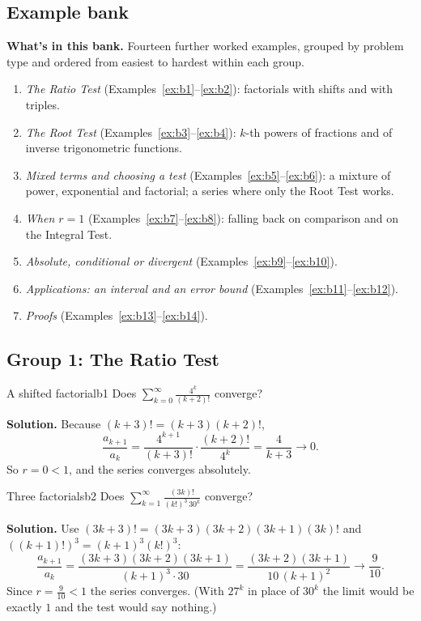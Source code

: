 \documentclass[11pt]{article}
\begin{document}
\subsection*{Example bank}

\textbf{What's in this bank.} Fourteen further worked examples, grouped by problem type and ordered from easiest to hardest within each group.
\begin{enumerate}[nosep]
  \item \emph{The Ratio Test} (Examples~\ref{ex:b1}--\ref{ex:b2}): factorials with shifts and with triples.
  \item \emph{The Root Test} (Examples~\ref{ex:b3}--\ref{ex:b4}): $k$-th powers of fractions and of inverse trigonometric functions.
  \item \emph{Mixed terms and choosing a test} (Examples~\ref{ex:b5}--\ref{ex:b6}): a mixture of power, exponential and factorial; a series where only the Root Test works.
  \item \emph{When $r=1$} (Examples~\ref{ex:b7}--\ref{ex:b8}): falling back on comparison and on the Integral Test.
  \item \emph{Absolute, conditional or divergent} (Examples~\ref{ex:b9}--\ref{ex:b10}).
  \item \emph{Applications: an interval and an error bound} (Examples~\ref{ex:b11}--\ref{ex:b12}).
  \item \emph{Proofs} (Examples~\ref{ex:b13}--\ref{ex:b14}).
\end{enumerate}

\subsection*{Group 1: The Ratio Test}

\begin{exmp}{A shifted factorial}{b1}
Does $\displaystyle\sum_{k=0}^\infty\frac{4^k}{(k+2)!}$ converge?

\textbf{Solution.} Because $(k+3)!=(k+3)(k+2)!$,
\[
\frac{a_{k+1}}{a_k}=\frac{4^{k+1}}{(k+3)!}\cdot\frac{(k+2)!}{4^k}=\frac4{k+3}\to0 .
\]
So $r=0<1$, and the series converges absolutely.
\end{exmp}

\begin{exmp}{Three factorials}{b2}
Does $\displaystyle\sum_{k=1}^\infty\frac{(3k)!}{(k!)^3\,30^k}$ converge?

\textbf{Solution.} Use $(3k+3)!=(3k+3)(3k+2)(3k+1)(3k)!$ and $\left((k+1)!\right)^3=(k+1)^3(k!)^3$:
\[
\frac{a_{k+1}}{a_k}=\frac{(3k+3)(3k+2)(3k+1)}{(k+1)^3\cdot30}=\frac{(3k+2)(3k+1)}{10\,(k+1)^2}\to\frac9{10}.
\]
Since $r=\frac9{10}<1$ the series converges. (With $27^k$ in place of $30^k$ the limit would be exactly $1$ and the test would say nothing.)
\end{exmp}
\end{document}
